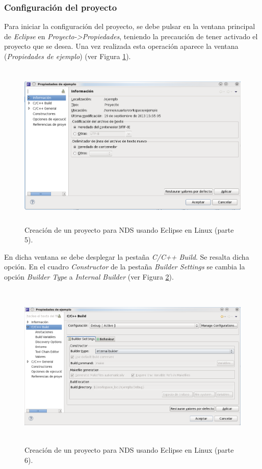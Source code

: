 \subsubsection{Configuración del proyecto}
Para iniciar la configuración del proyecto, se debe pulsar en la ventana principal de \textit{Eclipse} en \textit{Proyecto->Propiedades}, teniendo la precaución de tener activado el proyecto que se desea. Una vez realizada esta operación aparece la ventana (\textit{Propiedades de ejemplo}) (ver Figura \ref{fig_pig_p3_c1_eclipel5}).

\begin{figure}[t]
	\centering
	\includegraphics[height=8cm]{./Figuras/C2/c2_instan5.png}
	\caption{Creación de un proyecto para NDS usando Eclipse en Linux (parte 5).}
	\label{fig_pig_p3_c1_eclipel5}
\end{figure}

En dicha ventana se debe desplegar la pestaña \textit{C/C++ Build}. Se resalta dicha opción. En el cuadro \textit{Constructor} de la pestaña \textit{Builder Settings} se cambia la opción \textit{Builder Type} a \textit{Internal Builder} (ver Figura \ref{fig_pig_p3_c1_eclipel6}).


\begin{figure}[t]
	\centering
	\includegraphics[height=8cm]{./Figuras/C2/c2_instan6.png}
	\caption{Creación de un proyecto para NDS usando Eclipse en Linux (parte 6).}
	\label{fig_pig_p3_c1_eclipel6}
\end{figure}

